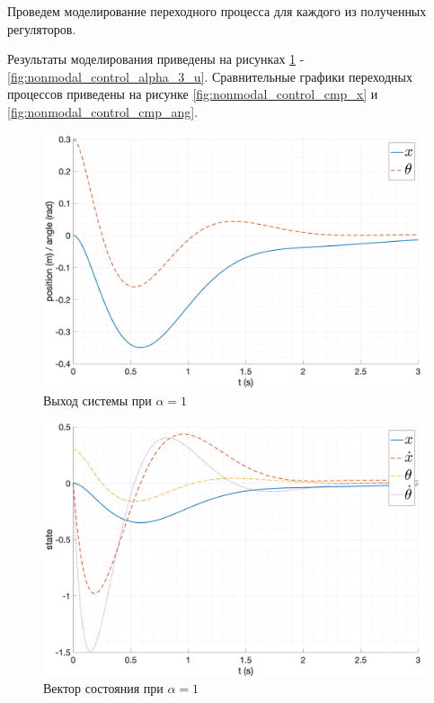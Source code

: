 Проведем моделирование переходного процесса для каждого из полученных регуляторов. 

Результаты моделирования приведены на рисунках \ref{fig:nonmodal_control_alpha_1} - \ref{fig:nonmodal_control_alpha_3_u}.
Сравнительные графики переходных процессов приведены на рисунке \ref{fig:nonmodal_control_cmp_x} и \ref{fig:nonmodal_control_cmp_ang}.

\begin{figure}[ht!]
    \centering
    \includegraphics[width=\textwidth]{media/plots/nonmodal_controllers/out_1.png}
    \caption{Выход системы при $\alpha = 1$}
    \label{fig:nonmodal_control_alpha_1}
\end{figure}
\begin{figure}
    \centering
    \includegraphics[width=\textwidth]{media/plots/nonmodal_controllers/state_1.png}
    \caption{Вектор состояния при $\alpha = 1$}
    \label{fig:nonmodal_control_alpha_1_u}
\end{figure}
